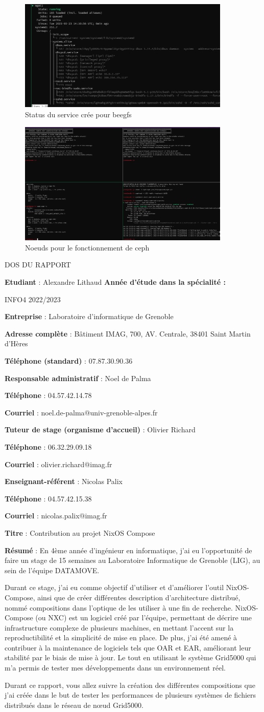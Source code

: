 \documentclass[a4paper,french,12pt, titlepage]{article}
\makeatletter
\newcommand{\makefooter}{%
  \makefooterhooka
}
\newcommand{\makefooterhooka}{%
    \begin{center}
        \begin{Large}
        DOS DU RAPPORT
        \end{Large}
    \end{center}
    
    
    \textbf{Etudiant} : Alexandre Lithaud
    \hfill \textbf{Année d’étude dans la spécialité :}
    
    \hfill INFO4 2022/2023
    
    \hfill
    
    \textbf{Entreprise} : Laboratoire d'informatique de Grenoble 

    \textbf{Adresse complète} : Bâtiment IMAG, 700, AV. Centrale, 38401
Saint Martin d'Hères

    \textbf{Téléphone (standard)} : 07.87.30.90.36
    
    \hfill
    
    \textbf{Responsable administratif} : Noel de Palma 

    \textbf{Téléphone} : 04.57.42.14.78

    \textbf{Courriel} : noel.de-palma@univ-grenoble-alpes.fr

    \hfill
    
    \textbf{Tuteur de stage (organisme d’accueil)} : Olivier Richard

    \textbf{Téléphone} : 06.32.29.09.18

    \textbf{Courriel} : olivier.richard@imag.fr
    
    \hfill
    
    \textbf{Enseignant-référent} : Nicolas Palix

    \textbf{Téléphone} : 04.57.42.15.38 

    \textbf{Courriel} : nicolas.palix@imag.fr 

    \hfill
    
    \textbf{Titre} : Contribution au projet NixOS Compose
    
    \hfill

    \textbf{Résumé} : En 4ème année d'ingénieur en informatique, j'ai eu
l'opportunité de faire un stage de 15 semaines au Laboratoire
Informatique de Grenoble (LIG), au sein de l'équipe DATAMOVE.\newline

Durant ce stage, j'ai eu comme objectif d'utiliser et d'améliorer
l'outil NixOS-Compose, ainsi que de créer différentes description
d'architecture distribué, nommé compositions dans l'optique de les
utiliser à une fin de recherche. NixOS-Compose (ou NXC) est un logiciel
créé par l'équipe, permettant de décrire une infrastructure complexe de
plusieurs machines, en mettant l'accent sur la reproductibilité et la
simplicité de mise en place. De plus, j'ai été amené à contribuer à la
maintenance de logiciels tels que OAR et EAR, améliorant leur stabilité
par le biais de mise à jour. Le tout en utilisant le système Grid5000
qui m'a permis de tester mes développements dans un environnement
réel.\newline

Durant ce rapport, vous allez suivre la création des différentes
compositions que j'ai créée dans le but de tester les performances de
plusieurs systèmes de fichiers distribués dans le réseau de nœud
Grid5000.
}
\makeatother
\begin{document}
\begin{figure}
\centering
\includegraphics[width=0.9\textwidth,height=0.9\textheight,keepaspectratio]{annexe/beegfs_service_yes.png}
\caption{Status du service crée pour beegfs}
\end{figure}

\begin{figure}
\centering
\includegraphics[width=0.9\textwidth,height=0.9\textheight,keepaspectratio]{annexe/ceph_osd_up.png}
\caption{Noeuds pour le fonctionnement de ceph}
\end{figure}

\begin{titlingpage}
\clearpage
\makefooter
\end{titlingpage}
\end{document}
